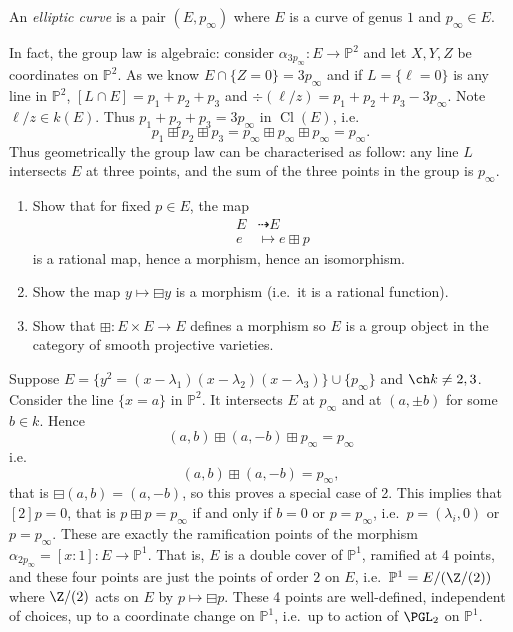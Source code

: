 \documentclass[a4paper]{article}
\DeclareMathOperator{\Cl}{Cl}
\renewcommand*{\P}{\mathbb{P}}
\newcommand{\rational}{\dashrightarrow} %
\begin{document}
\begin{definition}
  An \emph{elliptic curve} is a pair \((E, p_\infty)\) where \(E\) is a curve of genus \(1\) and \(p_\infty \in E\).
\end{definition}

In fact, the group law is algebraic: consider \(\alpha_{3p_\infty}: E \to \P^2\) and let \(X, Y, Z\) be coordinates on \(\P^2\). As we know \(E \cap \{Z = 0\} = 3p_\infty\) and if \(L = \{\ell = 0\}\) is any line in \(\P^2\), \([L \cap E] = p_1 + p_2 + p_3\) and \(\div(\ell/z) = p_1 + p_2 + p_3 - 3p_\infty\). Note \(\ell/z \in k(E)\). Thus \(p_1 + p_2 + p_3 = 3p_\infty\) in \(\Cl(E)\), i.e.
\[
  p_1 \boxplus p_2 \boxplus p_3 = p_\infty \boxplus p_\infty \boxplus p_\infty = p_\infty.
\]
Thus geometrically the group law can be characterised as follow: any line \(L\) intersects \(E\) at three points, and the sum of the three points in the group is \(p_\infty\).

\begin{ex}\leavevmode
  \begin{enumerate}
  \item Show that for fixed \(p \in E\), the map
    \begin{align*}
      E &\rational E \\
      e &\mapsto e \boxplus p
    \end{align*}
    is a rational map, hence a morphism, hence an isomorphism.
  \item Show the map \(y \mapsto \boxminus y\) is a morphism (i.e.\ it is a rational function).
  \item Show that \(\boxplus: E \times E \to E\) defines a morphism so \(E\) is a group object in the category of smooth projective varieties.
  \end{enumerate}
\end{ex}

Suppose \(E = \{y^2 = (x - \lambda_1)(x - \lambda_2)(x - \lambda_3)\} \cup \{p_\infty\}\) and \(\ch k \neq 2, 3\). Consider the line \(\{x = a\}\) in \(\P^2\). It intersects \(E\) at \(p_\infty\) and at \((a, \pm b)\) for some \(b \in k\). Hence
\[
  (a, b) \boxplus (a, -b) \boxplus p_\infty = p_\infty
\]
i.e.
\[
  (a, b) \boxplus (a, -b) = p_\infty,
\]
that is \(\boxminus (a, b) = (a, -b)\), so this proves a special case of 2. This implies that \([2] p = 0\), that is \(p \boxplus p = p_\infty\) if and only if \(b = 0\) or \(p = p_\infty\), i.e.\ \(p = (\lambda_i, 0)\) or \(p = p_\infty\). These are exactly the ramification points of the morphism \(\alpha_{2p_\infty} = [x:1]: E \to \P^1\). That is, \(E\) is a double cover of \(\P^1\), ramified at 4 points, and these four points are just the points of order \(2\) on \(E\), i.e.\ \(\P^1 = E/(\Z/(2))\) where \(\Z/(2)\) acts on \(E\) by \(p \mapsto \boxminus p\). These 4 points are well-defined, independent of choices, up to a coordinate change on \(\P^1\), i.e.\ up to action of \(\PGL_2\) on \(\P^1\).
\end{document}
